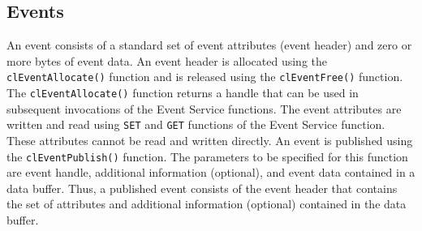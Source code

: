 \begin{flushleft}
\subsection{Events}
An event consists of a standard set of event attributes (event header) and zero or more bytes of event data. An event header is allocated using the 
{\tt{clEventAllocate()}} function and is released using the {\tt{clEventFree()}} function. The {\tt{clEventAllocate()}} function returns a handle that can be used in 
subsequent invocations of the Event Service functions. The event attributes are written and read using {\tt{SET}} and {\tt{GET}} functions of the Event 
Service function. These attributes cannot be read and written directly. An event is published using the {\tt{clEventPublish()}} function. The parameters
to be specified for this function are event handle, additional information (optional), and event data contained in a data buffer. Thus, a published 
event consists of the event header that contains the set of attributes and additional information (optional) contained in the data buffer. 


\end{flushleft}
